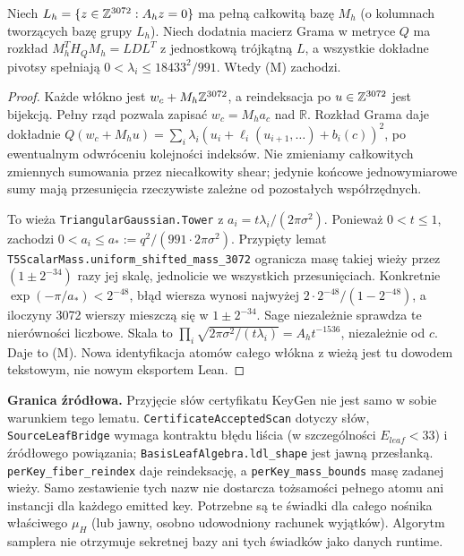 \documentclass[11pt,a4paper]{article}
\newcommand{\code}[1]{\nolinkurl{#1}}
\begin{document}
\begin{lemma}
Niech $L_h=\{z\in\mathbb Z^{3072}:A_hz=0\}$ ma pełną całkowitą bazę $M_h$
(o kolumnach tworzących bazę grupy $L_h$). Niech dodatnia macierz Grama
w metryce $Q$ ma rozkład $M_h^T H_Q M_h=L D L^T$ z jednostkową
trójkątną $L$, a wszystkie dokładne pivotsy spełniają
$0<\lambda_i\le18433^2/991$. Wtedy (M) zachodzi.
\end{lemma}
\begin{proof}
Każde włókno jest $w_c+M_h\mathbb Z^{3072}$, a reindeksacja po $u\in\mathbb Z^{3072}$
jest bijekcją. Pełny rząd pozwala zapisać $w_c=M_h a_c$ nad $\mathbb R$.
Rozkład Grama daje dokładnie
$Q(w_c+M_hu)=\sum_i\lambda_i(u_i+\ell_i(u_{i+1},\ldots)+b_i(c))^2$,
po ewentualnym odwróceniu kolejności indeksów. Nie zmieniamy całkowitych
zmiennych sumowania przez niecałkowity shear; jedynie końcowe jednowymiarowe
sumy mają przesunięcia rzeczywiste zależne od pozostałych współrzędnych.

To wieża \code{TriangularGaussian.Tower} z
$a_i=t\lambda_i/(2\pi\sigma^2)$. Ponieważ $0<t\le1$, zachodzi
$0<a_i\le a_*:=q^2/(991\cdot2\pi\sigma^2)$.
Przypięty lemat \code{T5ScalarMass.uniform_shifted_mass_3072}
ogranicza masę takiej wieży przez $(1\pm2^{-34})$ razy jej skalę,
jednolicie we wszystkich przesunięciach. Konkretnie
$\exp(-\pi/a_*)<2^{-48}$, błąd wiersza wynosi najwyżej
$2\cdot2^{-48}/(1-2^{-48})$, a iloczyny 3072 wierszy mieszczą się
w $1\pm2^{-34}$. Sage niezależnie sprawdza te nierówności liczbowe.
Skala to
$\prod_i\sqrt{2\pi\sigma^2/(t\lambda_i)}=A_h t^{-1536}$,
niezależnie od $c$. Daje to (M). Nowa identyfikacja atomów całego
włókna z wieżą jest tu dowodem tekstowym, nie nowym eksportem Lean.
\end{proof}

\textbf{Granica źródłowa.} Przyjęcie słów certyfikatu KeyGen nie jest samo
w sobie warunkiem tego lematu. \code{CertificateAcceptedScan} dotyczy słów,
\code{SourceLeafBridge} wymaga kontraktu błędu liścia (w szczególności
$E_{leaf}<33$) i źródłowego powiązania; \code{BasisLeafAlgebra.ldl_shape}
jest jawną przesłanką. \code{perKey_fiber_reindex} daje reindeksację,
a \code{perKey_mass_bounds} masę zadanej wieży. Samo zestawienie tych nazw
nie dostarcza tożsamości pełnego atomu ani instancji dla każdego emitted key.
Potrzebne są te świadki dla całego nośnika właściwego $\mu_H$ (lub jawny,
osobno udowodniony rachunek wyjątków). Algorytm samplera nie otrzymuje
sekretnej bazy ani tych świadków jako danych runtime.
\end{document}
